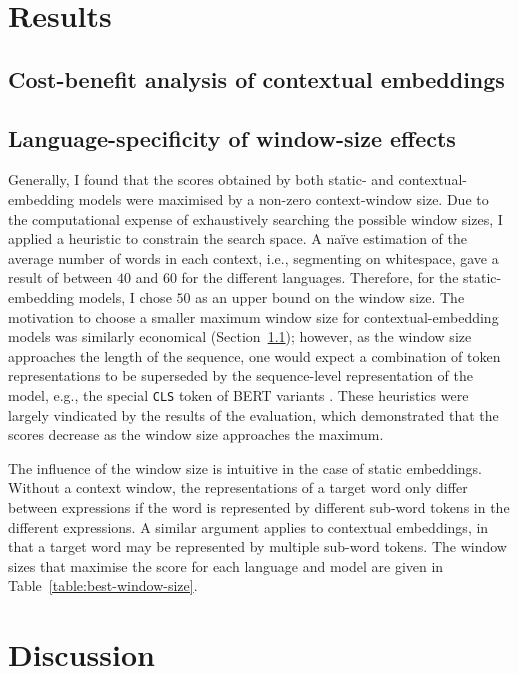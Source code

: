 \section{Results}

\subsection{Cost-benefit analysis of contextual embeddings}
\label{sec:cost-benefit}

\subsection{Language-specificity of window-size effects}

Generally, I found that the scores obtained by both static- and contextual-embedding
models were maximised by a non-zero context-window size.
Due to the computational expense of exhaustively searching the possible window sizes,
I applied a heuristic to constrain the search space.
A naïve estimation of the average number of words in each context, i.e., segmenting on
whitespace, gave a result of between $40$ and $60$ for the different languages.
Therefore, for the static-embedding models, I chose $50$ as an upper bound on the
window size.
The motivation to choose a smaller maximum window size for contextual-embedding models
was similarly economical (Section~\ref{sec:cost-benefit}); however, as the window size
approaches the length of the sequence, one would expect a combination of token
representations to be superseded by the sequence-level representation of the model,
e.g., the special \texttt{CLS} token of BERT variants \parencite[4174]{Devlin2019}.
These heuristics were largely vindicated by the results of the evaluation, which
demonstrated that the scores decrease as the window size approaches the maximum.

The influence of the window size is intuitive in the case of static embeddings.
Without a context window, the representations of a target word only differ between
expressions if the word is represented by different sub-word tokens in the different
expressions.
A similar argument applies to contextual embeddings, in that a target word may be
represented by multiple sub-word tokens.
The window sizes that maximise the score for each language and model are given in
Table~\ref{table:best-window-size}.

\section{Discussion}

